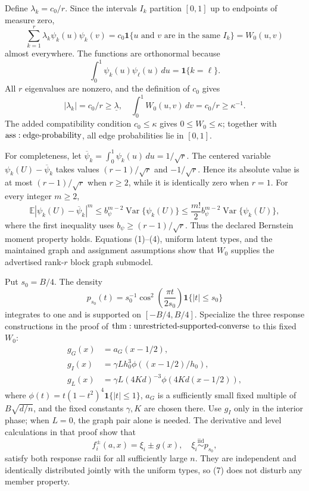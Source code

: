 Define \(\lambda_k=c_0/r\).  Since the intervals \(I_k\) partition \([0,1]\) up to endpoints of measure zero,
\[
 \sum_{k=1}^r\lambda_k\psi_k(u)\psi_k(v)
 =c_0\mathbf1\{u\text{ and }v\text{ are in the same }I_k\}=W_0(u,v)
\tag{1}
\]
almost everywhere.  The functions are orthonormal because
\[
 \int_0^1\psi_k(u)\psi_\ell(u)\,du=\mathbf1\{k=\ell\}.
\tag{2}
\]
All \(r\) eigenvalues are nonzero, and the definition of \(c_0\) gives
\[
 |\lambda_k|=c_0/r\geq\underline\lambda,
 \quad
 \int_0^1W_0(u,v)\,dv=c_0/r\geq\kappa^{-1}.
\tag{3}
\]
The added compatibility condition \(c_0\leq\kappa\) gives \(0\leq W_0\leq\kappa\); together with \({\rm ass:edge\text{-}probability}\), all edge probabilities lie in \([0,1]\).

For completeness, let \(\overline\psi_k=\int_0^1\psi_k(u)\,du=1/\sqrt r\).  The centered variable \(\psi_k(U)-\overline\psi_k\) takes values \((r-1)/\sqrt r\) and \(-1/\sqrt r\).  Hence its absolute value is at most \((r-1)/\sqrt r\) when \(r\geq2\), while it is identically zero when \(r=1\).  For every integer \(m\geq2\),
\[
 \mathbb E|\psi_k(U)-\overline\psi_k|^m
 \leq b_\psi^{m-2}\operatorname{Var}\{\psi_k(U)\}
 \leq\frac{m!}{2}b_\psi^{m-2}\operatorname{Var}\{\psi_k(U)\},
\tag{4}
\]
where the first inequality uses \(b_\psi\geq(r-1)/\sqrt r\).  Thus the declared Bernstein moment property holds.  Equations (1)--(4), uniform latent types, and the maintained graph and assignment assumptions show that \(W_0\) supplies the advertised rank-\(r\) block graph submodel.

Put \(s_0=B/4\).  The density
\[
 p_{s_0}(t)=s_0^{-1}\cos^2\!\left(\frac{\pi t}{2s_0}\right)
 \mathbf1\{|t|\leq s_0\}
\tag{5}
\]
integrates to one and is supported on \([-B/4,B/4]\).  Specialize the three response constructions in the proof of \({\rm thm:unrestricted\text{-}supported\text{-}converse}\) to this fixed \(W_0\):
\[
\begin{aligned}
 g_G(x)&=a_G(x-1/2),\\
 g_I(x)&=\gamma Lh_0^3\phi((x-1/2)/h_0),\\
 g_L(x)&=\gamma L(4Kd)^{-3}\phi(4Kd(x-1/2)),
\end{aligned}
\tag{6}
\]
where \(\phi(t)=t(1-t^2)^4\mathbf1\{|t|\leq1\}\), \(a_G\) is a sufficiently small fixed multiple of \(B\sqrt{d/n}\), and the fixed constants \(\gamma,K\) are chosen there.  Use \(g_I\) only in the interior phase; when \(L=0\), the graph pair alone is needed.  The derivative and level calculations in that proof show that
\[
 f_i^\pm(a,x)=\xi_i\pm g(x),\quad \xi_i\overset{\mathrm{iid}}{\sim}p_{s_0},
\tag{7}
\]
satisfy both response radii for all sufficiently large \(n\).  They are independent and identically distributed jointly with the uniform types, so (7) does not disturb any member property.


